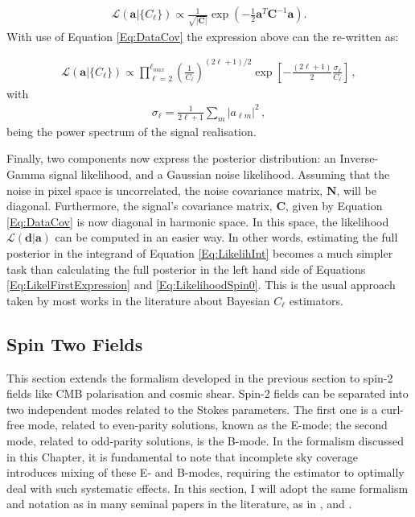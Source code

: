 \begin{align}
\mathcal{L}(\mathbf{a}|\{C_{\ell}\}) \propto \frac{1}{\sqrt{|\mathbf{C}|}}\exp\left( -\frac{1}{2} \mathbf{a}^T\mathbf{C}^{-1}\mathbf{a}\right).
\end{align}
\noindent With use of Equation \eqref{Eq:DataCov} the expression above can the re-written as:

\begin{align}
\mathcal{L}(\mathbf{a}|\{C_{\ell}\}) \propto \prod_{{\ell}=2}^{{\ell}_{max}}\left(\frac{1}{C_{\ell}}\right)^{(2\ell+1)/2} \exp \left[ -\frac{(2\ell+1)}{2}\frac{\sigma_\ell}{C_{\ell}}\right]\, ,
\end{align}
\noindent with 
\begin{align}
\sigma_{\ell} = \frac{1}{2\ell+1}\sum_m|a_{\ell m}|^2 \, ,
\end{align}
\noindent being the power spectrum of the signal realisation.

\qquad Finally, two components now express the posterior distribution: an Inverse-Gamma signal likelihood, and a Gaussian noise likelihood. Assuming that the noise in pixel space is uncorrelated, the noise covariance matrix, $\mathbf{N}$, will be diagonal. Furthermore, the signal's covariance matrix, $\mathbf{C}$, given by Equation \eqref{Eq:DataCov} is now diagonal in harmonic space. In this space, the likelihood $ \mathcal{L}(\mathbf{d}|\mathbf{a} )$ can be computed in an easier way. In other words, estimating the full posterior in the integrand of Equation \eqref{Eq:LikelihInt} becomes a much simpler task than calculating the full posterior in the left hand side of Equations \eqref{Eq:LikelFirstExpression} and \eqref{Eq:LikelihoodSpin0}. This is the usual approach taken by most works in the literature about Bayesian $C_{\ell}$ estimators.


\subsection{Spin Two Fields}\label{Sec:BPL:Spin-2_Form}
This section extends the formalism developed in the previous section to spin-2 fields like CMB polarisation and cosmic shear. Spin-2 fields can be separated into two independent modes related to the Stokes parameters. The first one is a curl-free mode, related to even-parity solutions, known as the E-mode; the second mode, related to odd-parity solutions, is the B-mode. In the formalism discussed in this Chapter, it is fundamental to note that incomplete sky coverage introduces mixing of these E- and B-modes, requiring the estimator to optimally deal with such systematic effects. In this section, I will adopt the same formalism and notation as in many seminal papers in the literature, as in \cite{Seljak1997}, \cite{Taylor2008} and \cite{Hikage2011}.

